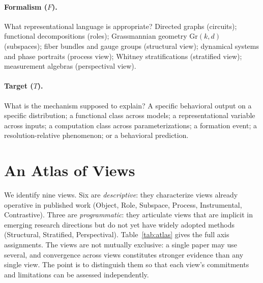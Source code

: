 \documentclass{article}
\newcommand{\Gr}{\mathrm{Gr}}
\begin{document}
\paragraph{Formalism ($F$).}
What representational language is appropriate?  Directed graphs (circuits);
functional decompositions (roles); Grassmannian geometry $\Gr(k,d)$
(subspaces); fiber bundles and gauge groups (structural view); dynamical
systems and phase portraits (process view); Whitney stratifications
(stratified view); measurement algebras (perspectival view).

\paragraph{Target ($T$).}
What is the mechanism supposed to explain?  A specific behavioral output
on a specific distribution; a functional class across models; a
representational variable across inputs; a computation class across
parameterizations; a formation event; a resolution-relative phenomenon;
or a behavioral prediction.

\section{An Atlas of Views}\label{sec:atlas}

We identify nine views.  Six are \emph{descriptive}: they characterize
views already operative in published work (Object, Role, Subspace,
Process, Instrumental, Contrastive).  Three are \emph{programmatic}:
they articulate views that are implicit in emerging research directions
but do not yet have widely adopted methods (Structural, Stratified,
Perspectival).
Table~\ref{tab:atlas} gives the full axis assignments.
The views are not mutually exclusive: a single paper may use several,
and convergence across views constitutes stronger evidence than any
single view.  The point is to distinguish them so that each view's
commitments and limitations can be assessed independently.
\end{document}
